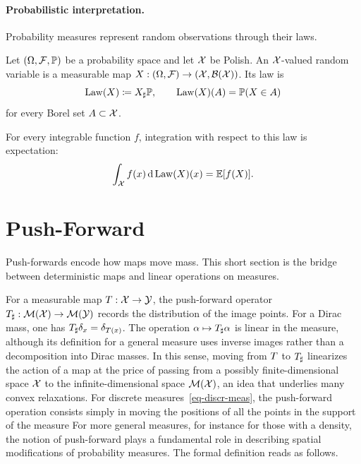 \paragraph{Probabilistic interpretation.}

Probability measures represent random observations through their laws.
\begin{defn}\label{def-random-variable-law}
	Let $(\Omega,\mathcal{F},\mathbb{P})$ be a probability space and let $\mathcal{X}$ be Polish. An $\mathcal{X}$-valued random variable is a measurable map $X:(\Omega,\mathcal{F})\to(\mathcal{X},\mathcal{B}(\mathcal{X}))$. Its law is
	\[
		\operatorname{Law}(X)\coloneqq X_\sharp\mathbb{P},
		\qquad
		\operatorname{Law}(X)(A)=\mathbb{P}(X\in A)
	\]
	for every Borel set $A\subset\mathcal{X}$.
\end{defn}
For every integrable function $f$, integration with respect to this law is expectation:
\[
	\int_{\mathcal{X}} f(x)\,\mathrm{d}\operatorname{Law}(X)(x)=\mathbb{E}[f(X)].
\]


\section{Push-Forward}
\label{sec-push-forward}


Push-forwards encode how maps move mass. This short section is the bridge between deterministic maps and linear operations on measures.

For a measurable map $T : \mathcal{X} \rightarrow \mathcal{Y}$, the push-forward operator $T_\sharp : \mathcal{M}(\mathcal{X}) \rightarrow \mathcal{M}(\mathcal{Y})$ records the distribution of the image points.
%
For a Dirac mass, one has $T_\sharp \delta_{x} = \delta_{T(x)}$. The operation $\alpha\mapsto T_\sharp\alpha$ is linear in the measure, although its definition for a general measure uses inverse images rather than a decomposition into Dirac masses. In this sense, moving from $T$ to $T_\sharp$ linearizes the action of a map at the price of passing from a possibly finite-dimensional space $\mathcal{X}$ to the infinite-dimensional space $\mathcal{M}(\mathcal{X})$, an idea that underlies many convex relaxations.
%
For discrete measures~\eqref{eq-discr-meas}, the push-forward operation consists simply in moving the positions of all the points in the support of the measure
For more general measures, for instance for those with a density, the notion of push-forward plays a fundamental role in describing spatial modifications of probability measures. The formal definition reads as follows.

